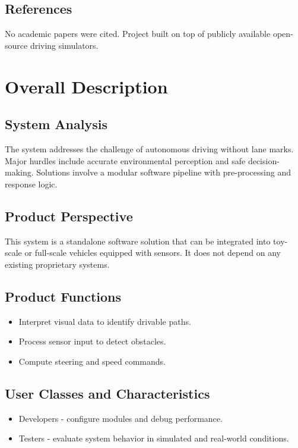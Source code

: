 \documentclass[12pt]{article}
\begin{document}
\subsection{References}
No academic papers were cited. Project built on top of publicly available open-source driving simulators.

\section{Overall Description}
\subsection{System Analysis}
The system addresses the challenge of autonomous driving without lane marks. Major hurdles include accurate environmental perception and safe decision-making. Solutions involve a modular software pipeline with pre-processing and response logic.

\subsection{Product Perspective}
This system is a standalone software solution that can be integrated into toy-scale or full-scale vehicles equipped with sensors. It does not depend on any existing proprietary systems.

\subsection{Product Functions}
\begin{itemize}[noitemsep]
  \item Interpret visual data to identify drivable paths.
  \item Process sensor input to detect obstacles.
  \item Compute steering and speed commands.
\end{itemize}

\subsection{User Classes and Characteristics}
\begin{itemize}[noitemsep]
  \item Developers - configure modules and debug performance.
  \item Testers - evaluate system behavior in simulated and real-world conditions.
\end{itemize}
\end{document}
